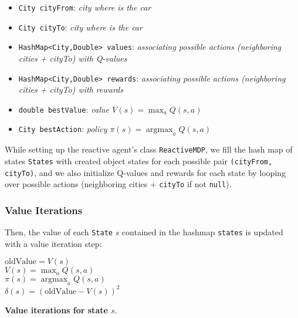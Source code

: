 \documentclass[11pt]{article}
\DeclareMathOperator*{\argmax}{argmax}
\begin{document}
\begin{itemize}
\item \verb|City cityFrom|: \small{\textit{city where is the car}}\\
\item \verb|City cityTo|: \small{\textit{city where is the car}}\\
\item \verb|HashMap<City,Double> values|: \small{\textit{associating possible actions (neighboring cities + cityTo) with Q-values}}\\
\item \verb|HashMap<City,Double> rewards|: \small{\textit{associating possible actions (neighboring cities + cityTo) with rewards}}\\
\item \verb|double bestValue|: \small{\textit{value $V(s) = \max_a Q(s,a)$}}\\
\item \verb|City bestAction|: \small{\textit{policy $\pi(s) = \argmax_a Q(s,a)$}}\\
\end{itemize}

While setting up the reactive agent's class \verb|ReactiveMDP|, we fill the hash map of states \verb|States| with created object states for each possible pair \verb|(cityFrom, cityTo)|, and we also initialize Q-values and rewards for each state by looping over possible actions (neighboring cities + \verb|cityTo| if not \verb|null|).

\subsubsection{Value Iterations}
Then, the value of each \verb|State| $s$ contained in the hashmap \verb|states| is updated with a value iteration step:

\begin{algorithm}[h]
    $\text{oldValue} = V(s)$\\
    $V(s) = \max_a Q(s,a)$\\
    $\pi(s) = \argmax_a Q(s,a)$\\
    $\delta(s) = \left( \text{oldValue} - V(s) \right)^2$
	\caption{\textbf{Value iterations for state $s$}.}
	\label{algo}
\end{algorithm}
\end{document}
